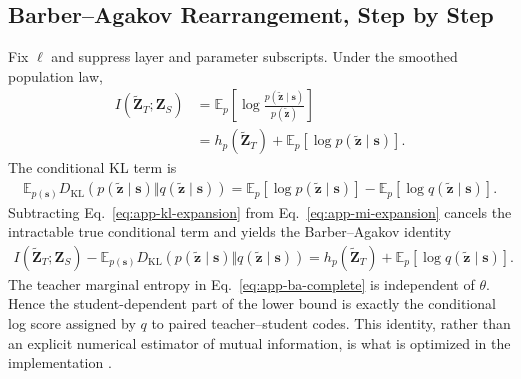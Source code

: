 \documentclass{article}
\newcommand{\E}{\mathbb{E}}
\newcommand{\KL}{\mathrm{KL}}
\newcommand{\bs}{\boldsymbol{s}}
\newcommand{\bz}{\boldsymbol{z}}
\theoremstyle{plain}
\theoremstyle{definition}
\theoremstyle{remark}
\begin{document}
\subsection{Barber--Agakov Rearrangement, Step by Step}
\label{app:ba-derivation}

Fix $\ell$ and suppress layer and parameter subscripts.  Under the smoothed
population law,
\begin{equation}
\begin{aligned}
  I(\widetilde{\boldsymbol Z}_T;\boldsymbol Z_S)
  &=\E_p\!\left[
  \log\frac{p(\widetilde{\bz}\mid\bs)}{p(\widetilde{\bz})}\right]\\
  &=h_p(\widetilde{\boldsymbol Z}_T)
  +\E_p[\log p(\widetilde{\bz}\mid\bs)].
  \label{eq:app-mi-expansion}
\end{aligned}
\end{equation}
The conditional KL term is
\begin{equation}
\begin{aligned}
  \E_{p(\bs)}D_{\KL}\!\left(p(\widetilde{\bz}\mid\bs)\Vert
  q(\widetilde{\bz}\mid\bs)\right)
  =\E_p[\log p(\widetilde{\bz}\mid\bs)]
  -\E_p[\log q(\widetilde{\bz}\mid\bs)].
  \label{eq:app-kl-expansion}
\end{aligned}
\end{equation}
Subtracting Eq.~\eqref{eq:app-kl-expansion} from
Eq.~\eqref{eq:app-mi-expansion} cancels the intractable true conditional term and
yields the Barber--Agakov identity
\begin{equation}
\begin{aligned}
  I(\widetilde{\boldsymbol Z}_T;\boldsymbol Z_S)
  -\E_{p(\bs)}D_{\KL}(p(\widetilde{\bz}\mid\bs)\Vert q(\widetilde{\bz}\mid\bs))
  =h_p(\widetilde{\boldsymbol Z}_T)
  +\E_p[\log q(\widetilde{\bz}\mid\bs)].
  \label{eq:app-ba-complete}
\end{aligned}
\end{equation}
The teacher marginal entropy in Eq.~\eqref{eq:app-ba-complete} is independent of
$\theta$.  Hence the student-dependent part of the lower bound is exactly the
conditional log score assigned by $q$ to paired teacher--student codes.  This
identity, rather than an explicit numerical estimator of mutual information, is
what is optimized in the implementation \citep{barber2003im,poole2019variational}.

\end{document}
